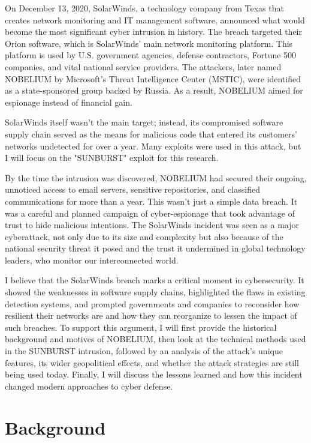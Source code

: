\documentclass[conference]{IEEEtran}
\begin{document}
On December 13, 2020, SolarWinds, a technology company from Texas that creates network monitoring and IT management software, announced what would 
become the most significant cyber intrusion in history. The breach targeted their Orion software, which is SolarWinds' main network monitoring platform.
 This platform is used by U.S. government agencies, defense contractors, Fortune 500 companies, and vital national service providers. The attackers, 
 later named NOBELIUM by Microsoft's Threat Intelligence Center (MSTIC), were identified as a state-sponsored group backed by Russia. As a result,
  NOBELIUM aimed for espionage instead of financial gain. 

SolarWinds itself wasn't the main target; instead, its compromised software supply chain served as the means for malicious code that entered its 
customers' networks undetected for over a year. Many exploits were used in this attack, but I will focus on the "SUNBURST" exploit for this research.

By the time the intrusion was discovered, NOBELIUM had secured their ongoing, unnoticed access to email servers, sensitive repositories, and classified 
communications for more than a year. This wasn't just a simple data breach. It was a careful and planned campaign of cyber-espionage that took advantage
 of trust to hide malicious intentions. The SolarWinds incident was seen as a major cyberattack, not only due to its size and complexity but also because
  of the national security threat it posed and the trust it undermined in global technology leaders, who monitor our interconnected world.

I believe that the SolarWinds breach marks a critical moment in cybersecurity. It showed the weaknesses in software supply chains, highlighted the flaws 
in existing detection systems, and prompted governments and companies to reconsider how resilient their networks are and how they can reorganize to lessen 
the impact of such breaches. To support this argument, I will first provide the historical background and motives of NOBELIUM, then look at the technical 
methods used in the SUNBURST intrusion, followed by an analysis of the attack's unique features, its wider geopolitical effects, and whether the attack 
strategies are still being used today. Finally, I will discuss the lessons learned and how this incident changed modern approaches to cyber defense.


\section{Background}
\end{document}
